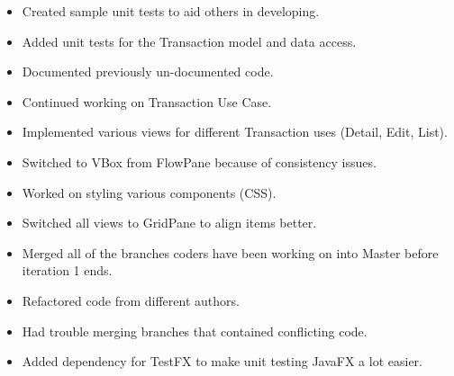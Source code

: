 \documentclass{article}
\begin{document}
  \begin{itemize}
    \item Created sample unit tests to aid others in developing.
    \item Added unit tests for the Transaction model and data access.
  \end{itemize}
	
  \begin{itemize}
    \item Documented previously un-documented code.
  \end{itemize}
  
  \begin{itemize}
    \item Continued working on Transaction Use Case.
    \item Implemented various views for different Transaction uses (Detail, Edit, List).
	\end{itemize}
	
	\begin{itemize}
    \item Switched to VBox from FlowPane because of consistency issues.
    \item Worked on styling various components (CSS).
	\end{itemize}
	\begin{itemize}
    \item Switched all views to GridPane to align items better.
	\end{itemize}
	\begin{itemize}
    \item Merged all of the branches coders have been working on into Master before iteration 1 ends.
    \item Refactored code from different authors.
    \item Had trouble merging branches that contained conflicting code.
    \item Added dependency for TestFX to make unit testing JavaFX a lot easier.
	\end{itemize}
\end{document}
